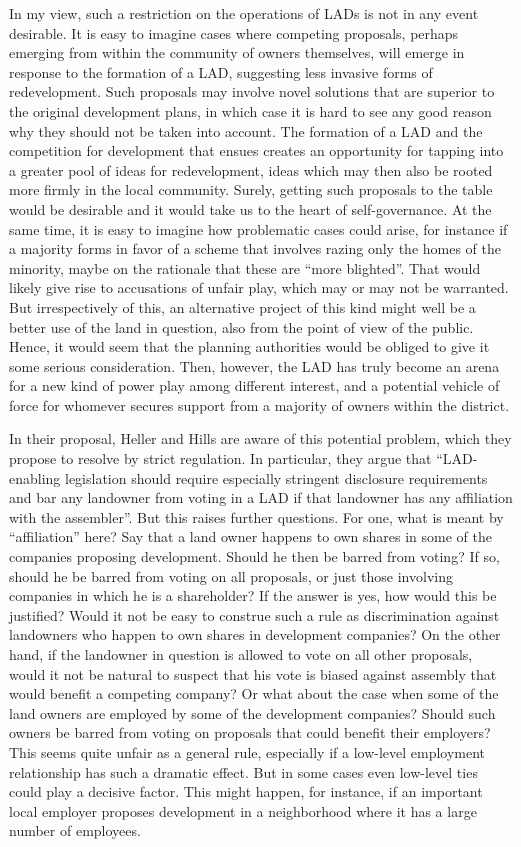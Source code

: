 In my view, such a restriction on the operations of LADs is not in any event desirable. It is easy to imagine cases where competing proposals, perhaps emerging from within the community of owners themselves, will emerge in response to the formation of a LAD, suggesting less invasive forms of redevelopment. Such proposals may involve novel solutions that are superior to the original development plans, in which case it is hard to see any good reason why they should not be taken into account. The formation of a LAD and the competition for development that ensues creates an opportunity for tapping into a greater pool of ideas for redevelopment, ideas which may then also be rooted more firmly in the local community. Surely, getting such proposals to the table would be desirable and it would take us to the heart of self-governance. At the same time, it is easy to imagine how problematic cases could arise, for instance if a majority forms in favor of a scheme that involves razing only the homes of the minority, maybe on the rationale that these are ``more blighted''. That would likely give rise to accusations of unfair play, which may or may not be warranted. But irrespectively of this, an alternative project of this kind might well be a better use of the land in question, also from the point of view of the public. Hence, it would seem that the planning authorities would be obliged to give it some serious consideration. Then, however, the LAD has truly become an arena for a new kind of power play among different interest, and a potential vehicle of force for whomever secures support from a majority of owners within the district.

In their proposal, Heller and Hills are aware of this potential problem, which they propose to resolve by strict regulation. In particular, they argue that ``LAD-enabling legislation should require especially stringent disclosure requirements and bar any landowner from voting in a LAD if that landowner has any affiliation with the assembler''. But this raises further questions. For one, what is meant by ``affiliation'' here? Say that a land owner happens to own shares in some of the companies proposing development. Should he then be barred from voting? If so, should he be barred from voting on all proposals, or just those involving companies in which he is a shareholder? If the answer is yes, how would this be justified? Would it not be easy to construe such a rule as discrimination against landowners who happen to own shares in development companies? On the other hand, if the landowner in question is allowed to vote on all other proposals, would it not be natural to suspect that his vote is biased against assembly that would benefit a competing company? Or what about the case when some of the land owners are employed by some of the development companies? Should such owners be barred from voting on proposals that could benefit their employers? This seems quite unfair as a general rule, especially if a low-level employment relationship has such a dramatic effect. But in some cases even low-level ties could play a decisive factor. This might happen, for instance, if an important local employer proposes development in a neighborhood where it has a large number of employees.

